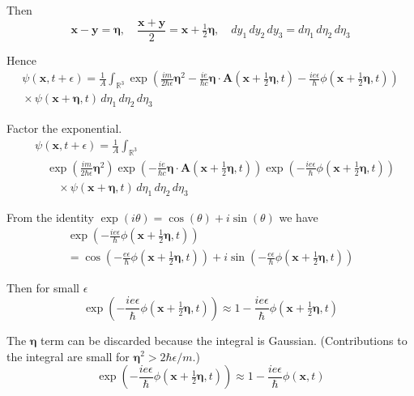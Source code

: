 \documentclass[12pt]{article}
\newcommand\INT{\int_{\mathbb R^3}}
\begin{document}
Then
\begin{equation*}
\mathbf x-\mathbf y=\boldsymbol\eta,\quad
\frac{\mathbf x+\mathbf y}{2}=\mathbf{x}+\tfrac{1}{2}\boldsymbol\eta,\quad
dy_1\,dy_2\,dy_3=d\eta_1\,d\eta_2\,d\eta_3
\end{equation*}

Hence
\begin{multline*}
\psi(\mathbf x,t+\epsilon)=
\frac{1}{A}\INT\exp
\left(
\frac{im}{2\hbar\epsilon}\boldsymbol\eta^2
-\frac{ie}{\hbar c}\boldsymbol\eta\cdot\mathbf A\left(\mathbf x+\tfrac{1}{2}\boldsymbol\eta,t\right)
-\frac{ie\epsilon}{\hbar}\phi\left(\mathbf x+\tfrac{1}{2}\boldsymbol\eta,t\right)
\right)
\\
{}\times\psi(\mathbf x+\boldsymbol\eta,t)
\,d\eta_1\,d\eta_2\,d\eta_3
\end{multline*}

Factor the exponential.
\begin{align*}
&\psi(\mathbf x,t+\epsilon)=
\frac{1}{A}\INT
\\
&\quad{}\exp\left(\frac{im}{2\hbar\epsilon}\boldsymbol\eta^2\right)
\exp\left(-\frac{ie}{\hbar c}\boldsymbol\eta\cdot\mathbf A\left(\mathbf x+\tfrac{1}{2}\boldsymbol\eta,t\right)\right)
\exp\left(-\frac{ie\epsilon}{\hbar}\phi\left(\mathbf x+\tfrac{1}{2}\boldsymbol\eta,t\right)\right)
\\
&\quad\quad{}\times\psi(\mathbf x+\boldsymbol\eta,t)
\,d\eta_1\,d\eta_2\,d\eta_3
\tag{2}
\end{align*}

From the identity $\exp(i\theta)=\cos(\theta)+i\sin(\theta)$ we have
\begin{multline*}
\exp\left(-\frac{ie\epsilon}{\hbar}\phi\left(\mathbf x+\tfrac{1}{2}\boldsymbol\eta,t\right)\right)
\\
=\cos\left(-\frac{e\epsilon}{\hbar}\phi\left(\mathbf x+\tfrac{1}{2}\boldsymbol\eta,t\right)\right)
+i\sin\left(-\frac{e\epsilon}{\hbar}\phi\left(\mathbf x+\tfrac{1}{2}\boldsymbol\eta,t\right)\right)
\end{multline*}

Then for small $\epsilon$
\begin{equation*}
\exp\left(-\frac{ie\epsilon}{\hbar}\phi\left(\mathbf x+\tfrac{1}{2}\boldsymbol\eta,t\right)\right)
\approx
1-\frac{ie\epsilon}{\hbar}\phi\left(\mathbf x+\tfrac{1}{2}\boldsymbol\eta,t\right)
\end{equation*}

The $\boldsymbol\eta$ term can be discarded because the integral is Gaussian.
(Contributions to the integral are small for $\boldsymbol\eta^2>2\hbar\epsilon/m$.)
\begin{equation*}
\exp\left(-\frac{ie\epsilon}{\hbar}\phi\left(\mathbf x+\tfrac{1}{2}\boldsymbol\eta,t\right)\right)\approx
1-\frac{ie\epsilon}{\hbar}\phi(\mathbf x,t)
\tag{3}
\end{equation*}
\end{document}
